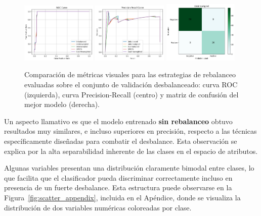 \documentclass[11pt]{article}
\begin{document}
\begin{figure}[H]
    \centering
    \includegraphics[width=0.32\textwidth]{figures/rebalanceo_roc.png}
    \hfill
    \includegraphics[width=0.32\textwidth]{figures/rebalanceo_pr.png}
    \hfill
    \includegraphics[width=0.32\textwidth]{figures/rebalanceo_conf_matrix.png}
    \caption{Comparación de métricas visuales para las estrategias de rebalanceo evaluadas sobre el conjunto de validación desbalanceado: curva ROC (izquierda), curva Precision-Recall (centro) y matriz de confusión del mejor modelo (derecha).}
    \label{fig:rebalanceo_curves}
\end{figure}

Un aspecto llamativo es que el modelo entrenado \textbf{sin rebalanceo} obtuvo resultados muy similares, e incluso superiores en precisión, respecto a las técnicas específicamente diseñadas para combatir el desbalance. Esta observación se explica por la alta separabilidad inherente de las clases en el espacio de atributos.

Algunas variables presentan una distribución claramente bimodal entre clases, lo que facilita que el clasificador pueda discriminar correctamente incluso en presencia de un fuerte desbalance. Esta estructura puede observarse en la Figura~\ref{fig:scatter_appendix}, incluida en el Apéndice, donde se visualiza la distribución de dos variables numéricas coloreadas por clase.
\end{document}
